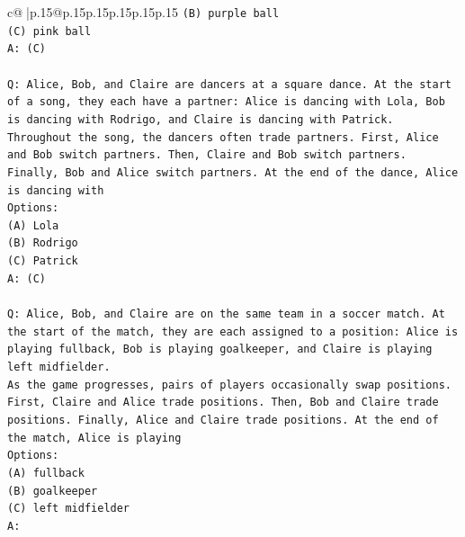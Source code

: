 \documentclass{article}
\begin{document}
{\begin{supertabular}{c@{$\;$}|p{.15\linewidth}@{}p{.15\linewidth}p{.15\linewidth}p{.15\linewidth}p{.15\linewidth}p{.15\linewidth}}
{{{\texttt{(B) purple ball} \\
\texttt{(C) pink ball} \\
\texttt{A: (C)} \\
\\ 
\texttt{Q: Alice, Bob, and Claire are dancers at a square dance. At the start of a song, they each have a partner: Alice is dancing with Lola, Bob is dancing with Rodrigo, and Claire is dancing with Patrick.} \\
\texttt{Throughout the song, the dancers often trade partners. First, Alice and Bob switch partners. Then, Claire and Bob switch partners. Finally, Bob and Alice switch partners. At the end of the dance, Alice is dancing with} \\
\texttt{Options:} \\
\texttt{(A) Lola} \\
\texttt{(B) Rodrigo} \\
\texttt{(C) Patrick} \\
\texttt{A: (C)} \\
\\ 
\texttt{Q: Alice, Bob, and Claire are on the same team in a soccer match. At the start of the match, they are each assigned to a position: Alice is playing fullback, Bob is playing goalkeeper, and Claire is playing left midfielder.} \\
\texttt{As the game progresses, pairs of players occasionally swap positions. First, Claire and Alice trade positions. Then, Bob and Claire trade positions. Finally, Alice and Claire trade positions. At the end of the match, Alice is playing} \\
\texttt{Options:} \\
\texttt{(A) fullback} \\
\texttt{(B) goalkeeper} \\
\texttt{(C) left midfielder} \\
\texttt{A:} \\
            }
        }
    }
     \\ \\


\end{supertabular}}
\end{document}
